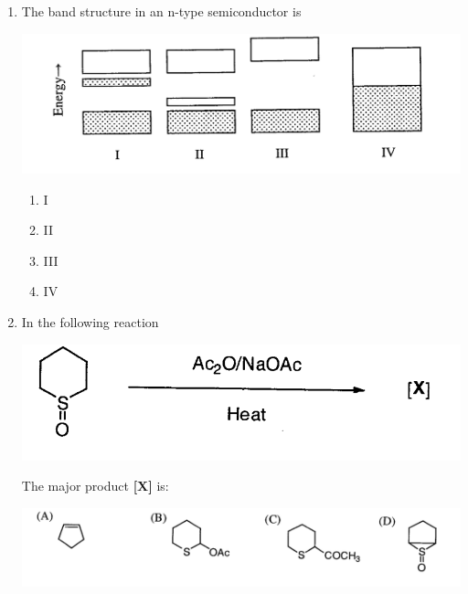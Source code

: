 \documentclass[journal,12pt,onecolumn]{IEEEtran}
\theoremstyle{remark}
\begin{document}
\begin{enumerate}
\item    The band structure in an n-type semiconductor is \hfill{}
 

\begin{center}
    \includegraphics[scale=0.75]{figs/image1.png}
\end{center}

\begin{multicols}{2}
\begin{enumerate}[label=(\Alph*), leftmargin=*]
\item I  
\item II  
\item III  
\item IV  
\end{enumerate}
\end{multicols}
 



\item    In the following reaction \hfill{}
 

\begin{center}
\includegraphics[scale=1]{figs/image2.png}

\end{center}

\noindent The major product \textbf{[X]} is:
 

\includegraphics[scale=0.75]{figs/image3.png}


\end{enumerate}
\end{document}
